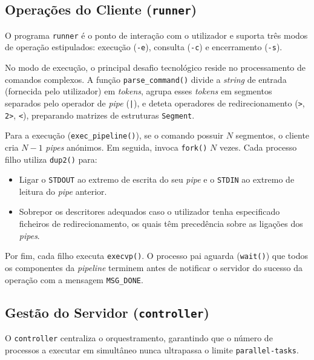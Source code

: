 \documentclass[runningheads,11pt]{llncs}
\begin{document}
        \subsection{Operações do Cliente (\texttt{runner})}
        O programa \texttt{runner} é o ponto de interação com o utilizador e suporta três modos de operação estipulados: execução (\texttt{-e}), consulta (\texttt{-c}) e encerramento (\texttt{-s}). 
        
        No modo de execução, o principal desafio tecnológico reside no processamento de comandos complexos. A função \texttt{parse\_command()} divide a \textit{string} de entrada (fornecida pelo utilizador) em \textit{tokens}, agrupa esses \textit{tokens} em segmentos separados pelo operador de \textit{pipe} (\texttt{|}), e deteta operadores de redirecionamento (\texttt{>}, \texttt{2>}, \texttt{<}), preparando matrizes de estruturas \texttt{Segment}.

        Para a execução (\texttt{exec\_pipeline()}), se o comando possuir $N$ segmentos, o cliente cria $N-1$ \textit{pipes} anónimos. Em seguida, invoca \texttt{fork()} $N$ vezes. Cada processo filho utiliza \texttt{dup2()} para:
        \begin{itemize}
                \item Ligar o \texttt{STDOUT} ao extremo de escrita do seu \textit{pipe} e o \texttt{STDIN} ao extremo de leitura do \textit{pipe} anterior.
                \item Sobrepor os descritores adequados caso o utilizador tenha especificado ficheiros de redirecionamento, os quais têm precedência sobre as ligações dos \textit{pipes}.
        \end{itemize}
        Por fim, cada filho executa \texttt{execvp()}. O processo pai aguarda (\texttt{wait()}) que todos os componentes da \textit{pipeline} terminem antes de notificar o servidor do sucesso da operação com a mensagem \texttt{MSG\_DONE}.

        \subsection{Gestão do Servidor (\texttt{controller})}
        O \texttt{controller} centraliza o orquestramento, garantindo que o número de processos a executar em simultâneo nunca ultrapassa o limite \texttt{parallel-tasks}. 
        
\end{document}

